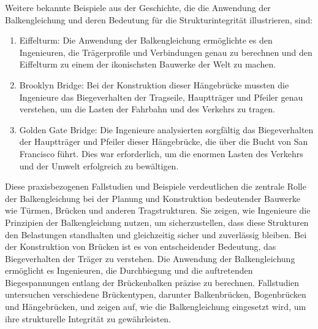 Weitere bekannte Beispiele aus der Geschichte, die die Anwendung der Balkengleichung und deren Bedeutung für die Strukturintegrität illustrieren, sind:
\begin{enumerate}
\item Eiffelturm:
Die Anwendung der Balkengleichung ermöglichte es den Ingenieuren, die Trägerprofile und Verbindungen genau zu berechnen und den Eiffelturm zu einem der ikonischsten Bauwerke der Welt zu machen.
\item Brooklyn Bridge:
Bei der Konstruktion dieser Hängebrücke mussten die Ingenieure das Biegeverhalten der Tragseile, Hauptträger und Pfeiler genau verstehen, um die Lasten der Fahrbahn und des Verkehrs zu tragen.
\item Golden Gate Bridge:
Die Ingenieure analysierten sorgfältig das Biegeverhalten der Hauptträger und Pfeiler dieser Hängebrücke, die über die Bucht von San Francisco führt. Dies war erforderlich, um die enormen Lasten des Verkehrs und der Umwelt erfolgreich zu bewältigen.
\end{enumerate}
Diese praxisbezogenen Fallstudien und Beispiele verdeutlichen die zentrale Rolle der Balkengleichung bei der Planung und Konstruktion bedeutender Bauwerke wie Türmen, Brücken und anderen Tragstrukturen. 
Sie zeigen, wie Ingenieure die Prinzipien der Balkengleichung nutzen, um sicherzustellen, dass diese Strukturen den Belastungen standhalten und gleichzeitig sicher und zuverlässig bleiben.
Bei der Konstruktion von Brücken ist es von entscheidender Bedeutung, das Biegeverhalten der Träger zu verstehen. 
Die Anwendung der Balkengleichung ermöglicht es Ingenieuren, die Durchbiegung und die auftretenden Biegespannungen entlang der Brückenbalken präzise zu berechnen. Fallstudien untersuchen verschiedene Brückentypen, darunter Balkenbrücken, Bogenbrücken und Hängebrücken, und zeigen auf, wie die Balkengleichung eingesetzt wird, um ihre strukturelle Integrität zu gewährleisten.
